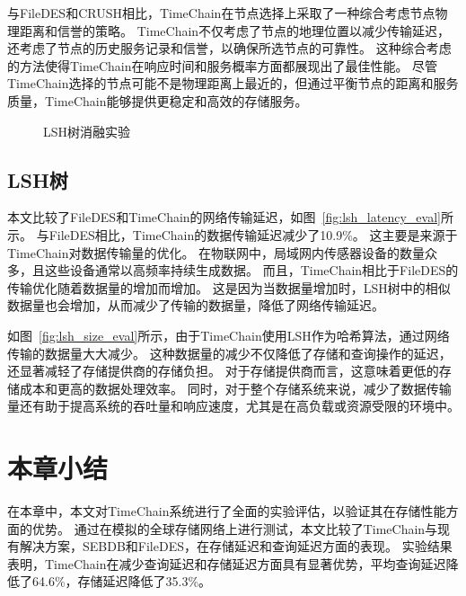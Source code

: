 与FileDES和CRUSH相比，TimeChain在节点选择上采取了一种综合考虑节点物理距离和信誉的策略。
TimeChain不仅考虑了节点的地理位置以减少传输延迟，还考虑了节点的历史服务记录和信誉，以确保所选节点的可靠性。
这种综合考虑的方法使得TimeChain在响应时间和服务概率方面都展现出了最佳性能。
尽管TimeChain选择的节点可能不是物理距离上最近的，但通过平衡节点的距离和服务质量，TimeChain能够提供更稳定和高效的存储服务。

\begin{figure*}[t]
    \centering
    \begin{minipage}{0.9\linewidth}
        \quad
        \caption{LSH树消融实验} 
    \end{minipage}
\end{figure*}

\subsection{LSH树}
本文比较了FileDES和TimeChain的网络传输延迟，如图~\autoref{fig:lsh_latency_eval}所示。
与FileDES相比，TimeChain的数据传输延迟减少了10.9\%。
这主要是来源于TimeChain对数据传输量的优化。
在物联网中，局域网内传感器设备的数量众多，且这些设备通常以高频率持续生成数据。
而且，TimeChain相比于FileDES的传输优化随着数据量的增加而增加。
这是因为当数据量增加时，LSH树中的相似数据量也会增加，从而减少了传输的数据量，降低了网络传输延迟。

如图~\autoref{fig:lsh_size_eval}所示，由于TimeChain使用LSH作为哈希算法，通过网络传输的数据量大大减少。
这种数据量的减少不仅降低了存储和查询操作的延迟，还显著减轻了存储提供商的存储负担。
对于存储提供商而言，这意味着更低的存储成本和更高的数据处理效率。
同时，对于整个存储系统来说，减少了数据传输量还有助于提高系统的吞吐量和响应速度，尤其是在高负载或资源受限的环境中。

\section{本章小结}
在本章中，本文对TimeChain系统进行了全面的实验评估，以验证其在存储性能方面的优势。
通过在模拟的全球存储网络上进行测试，本文比较了TimeChain与现有解决方案，SEBDB和FileDES，在存储延迟和查询延迟方面的表现。
实验结果表明，TimeChain在减少查询延迟和存储延迟方面具有显著优势，平均查询延迟降低了64.6\%，存储延迟降低了35.3\%。

